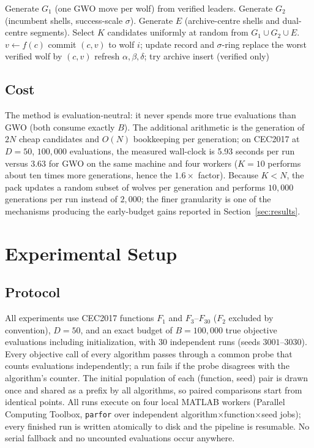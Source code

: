 \documentclass[journal]{IEEEtran}
\newcommand{\method}{VAST-GWO}
\begin{document}
\begin{algorithm}[t]
\caption{\method{} (one generation, exactly $K$ true evaluations)}
\begin{algorithmic}[1]
\State Generate $G_1$ (one GWO move per wolf) from verified leaders.
\State Generate $G_2$ (incumbent shells, success-scale $\sigma$).
\State Generate $E$ (archive-centre shells and dual-centre segments).
\State Select $K$ candidates uniformly at random from $G_1\cup G_2\cup E$.
  \State $v \gets f(c)$ 
    \State commit $(c,v)$ to wolf $i$; update record and $\sigma$-ring
    \State replace the worst verified wolf by $(c,v)$
  \EndIf
  \State refresh $\alpha,\beta,\delta$; try archive insert (verified only)
\EndFor
\end{algorithmic}
\end{algorithm}

\subsection{Cost}
The method is evaluation-neutral: it never spends more true evaluations than
GWO (both consume exactly $B$). The additional arithmetic is the generation
of $2N$ cheap candidates and $O(N)$ bookkeeping per generation; on CEC2017 at
$D=50$, $100{,}000$ evaluations, the measured wall-clock is 5.93 seconds
per run versus 3.63 for GWO on the same machine and four workers
($K=10$ performs about ten times more generations, hence the $1.6\times$
factor). Because
$K<N$, the pack updates a random subset of wolves per generation and performs
$10{,}000$ generations per run instead of $2{,}000$; the finer granularity is
one of the mechanisms producing the early-budget gains reported in
Section~\ref{sec:results}.

\section{Experimental Setup}
\subsection{Protocol}
All experiments use CEC2017 functions $F_1$ and $F_3$--$F_{30}$ ($F_2$
excluded by convention), $D=50$, and an exact budget of $B=100{,}000$ true
objective evaluations including initialization, with $30$ independent runs
(seeds $3001$--$3030$). Every objective call of every algorithm passes
through a common probe that counts evaluations independently; a run fails if
the probe disagrees with the algorithm's counter. The initial population of
each (function, seed) pair is drawn once and shared as a prefix by all
algorithms, so paired comparisons start from identical points. All runs
execute on four local MATLAB workers (Parallel Computing Toolbox, \texttt{parfor}
over independent algorithm$\times$function$\times$seed jobs); every finished
run is written atomically to disk and the pipeline is resumable. No serial
fallback and no uncounted evaluations occur anywhere.
\end{document}
